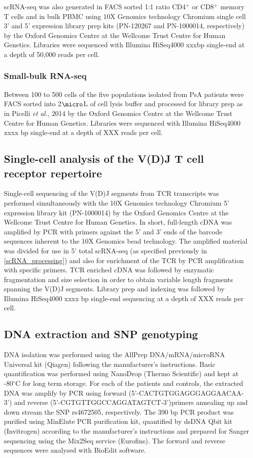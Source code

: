 scRNA-seq was also generated in FACS sorted 1:1 ratio CD4$^{+}$ or CD8$^{+}$ memory T cells and in bulk PBMC using 10X Genomics technology Chromium single cell 3' and 5' expression library prep kits (PN-120267 and PN-1000014, respectively) by the Oxford Genomics Centre at the Wellcome Trust Centre for Human Genetics. Libraries were sequenced with Illumina HiSeq4000 xxxbp single-end at a depth of 50,000 reads per cell.

\subsubsection{Small-bulk RNA-seq } 
Between 100 to 500 cells of the five populations isolated from PsA patients were FACS sorted into 2$\micro$L of cell lysis buffer and processed for library prep as in Picelli \textit{et al.}, 2014 by the Oxford Genomics Centre at the Wellcome Trust Centre for Human Genetics. Libraries were sequenced with Illumina HiSeq4000 xxxx bp single-end at a depth of XXX reads per cell.


\subsection{Single-cell analysis of the V(D)J T cell receptor repertoire}
Single-cell sequencing of the V(D)J segments from TCR transcripts was performed simultaneously with the 10X Genomics technology Chromium 5' expression library kit (PN-1000014) by the Oxford Genomics Centre at the Wellcome Trust Centre for Human Genetics. In short, full-length cDNA was amplified by PCR with primers against the 5’ and 3’ ends of the barcode sequences inherent to the 10X Genomics bead technology. The amplified material was divided for use in 5' total scRNA-seq (as specified previously in \ref{scRNA_processing}) and also for enrichment of the TCR by PCR amplification with specific primers. TCR enriched cDNA was followed by enzymatic fragmentation and size selection in order to obtain variable length fragments spanning the V(D)J segments. Library prep and indexing was followed by Illumina HiSeq4000 xxxx bp single-end sequencing at a depth of XXX reads per cell.

\subsection{DNA extraction and SNP genotyping}
DNA isolation was performed using the AllPrep DNA/mRNA/microRNA Universal kit (Qiagen) following the manufacturer's instructions. Basic quantification was performed using NanoDrop (Thermo Scientific) and kept at -80{$^\circ$}C for long term storage. For each of the patients and controls, the extracted DNA was amplify by PCR using forward (5'-CACTGTGGAGGGAGGAACAA-3') and reverse (5'-CGTGTTGGCCAGGATAGTCT-3')primers annealing up and down stream the SNP rs4672505, respectively. The 390 bp PCR product was purified using MinElute PCR purification kit, quantified by dsDNA Qbit kit (Invitrogen) according to the manufacturer's instructions and prepared for Sanger sequencing using the Mix2Seq service (Eurofins). The forward and reverse sequences were analysed with BioEdit software.



